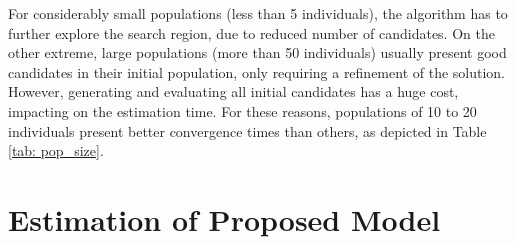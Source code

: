 For considerably small populations (less than 5 individuals), the algorithm has to further explore the search region, due to reduced number of candidates. On the other extreme, large populations (more than 50 individuals) usually present good candidates in their initial population, only requiring a refinement of the solution. However, generating and evaluating all initial candidates has a huge cost, impacting on the estimation time. For these reasons, populations of 10 to 20 individuals present better convergence times than others, as depicted in Table \ref{tab: pop_size}.

\section{Estimation of Proposed Model}
